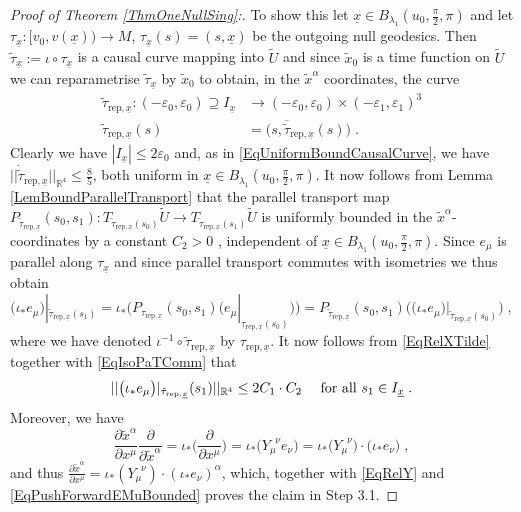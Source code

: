 \documentclass[reqno]{article}
\newcommand{\R}{\mathbb{R}}
\newcommand{\ux}{\underline{x}}
\newcommand{\rd}{\partial}
\begin{document}
\begin{proof}[Proof of Theorem \ref{ThmOneNullSing}:]
To show this let $\ux  \in B_{\lambda_1}(u_0, \frac{\pi}{2}, \pi)$ and let $\tau_{\ux} : [v_0, v(\ux)) \to M$, $\tau_{\ux} (s) = (s, \ux)$ be the outgoing null geodesics. Then $\tilde{\tau}_{\ux} := \iota \circ \tau_{\ux}$ is a causal curve mapping into $\tilde{U}$ and since $\tilde{x}_0$ is a time function on $\tilde{U}$ we can reparametrise $\tilde{\tau}_{\ux}$ by $\tilde{x}_0$ to obtain, in the $\tilde{x}^\alpha$ coordinates, the curve
\begin{equation*}
\begin{split}
\tilde{\tau}_{\mathrm{rep}, \ux} : (-\varepsilon_0, \varepsilon_0) \supseteq I_{\ux} &\to (-\varepsilon_0, \varepsilon_0) \times (-\varepsilon_1, \varepsilon_1)^3 \\
\tilde{\tau}_{\mathrm{rep}, \ux}(s) &= \big(s, \overline{\tilde{\tau}}_{\mathrm{rep}, \ux}(s)\big) \;.
\end{split}
\end{equation*}
Clearly we have $|I_{\ux}| \leq 2 \varepsilon_0$ and, as in \eqref{EqUniformBoundCausalCurve}, we have $||\dot{\tilde{\tau}}_{\mathrm{rep}, \ux} ||_{\R^4} \leq \frac{8}{5}$, both uniform in $\ux \in B_{\lambda_1}(u_0, \frac{\pi}{2}, \pi)$.
It now follows from Lemma \ref{LemBoundParallelTransport} that the parallel transport map $P_{\tilde{\tau}_{\mathrm{rep}, \ux}} (s_0, s_1) : T_{\tilde{\tau}_{\mathrm{rep}, \ux}(s_0)} \tilde{U} \to T_{\tilde{\tau}_{\mathrm{rep}, \ux}(s_1)} \tilde{U}$ is uniformly bounded in the $\tilde{x}^\alpha$-coordinates by a constant $C_2 >0$ , independent of $\ux \in B_{\lambda_1}(u_0, \frac{\pi}{2}, \pi)$. Since $e_\mu$ is parallel along $\tau_{\ux}$ and since parallel transport commutes with isometries we thus obtain 
\begin{equation}
\label{EqIsoPaTComm}
\big(\iota_* e_\mu)|_{\tilde{\tau}_{\mathrm{rep}, \ux} (s_1)} = \iota_* \Big( P_{\tau_{\mathrm{rep}, \ux}} (s_0, s_1) \big(e_\mu|_{\tau_{\mathrm{rep}, \ux}(s_0)}\big)\Big) = P_{\tilde{\tau}_{\mathrm{rep}, \ux}} (s_0, s_1) \Big( \big(\iota_* e_\mu\big)|_{\tilde{\tau}_{\mathrm{rep}, \ux}(s_0)}\Big) \;,
\end{equation}
where we have denoted $\iota^{-1} \circ \tilde{\tau}_{\mathrm{rep}, \ux}$ by $\tau_{\mathrm{rep}, \ux}$. It now follows from \eqref{EqRelXTilde} together with \eqref{EqIsoPaTComm} that
\begin{equation}
\label{EqPushForwardEMuBounded}
||\big( \iota_* e_\mu\big)|_{\tilde{\tau}_{\mathrm{rep}, \ux}} (s_1) ||_{\R^4} \leq 2 C_1 \cdot C_2  \quad \textnormal{ for all } s_1 \in I_{\ux}\;.
\end{equation} 
Moreover, we have $$\frac{\rd \tilde{x}^\alpha}{\rd x^\mu} \frac{\rd}{\rd \tilde{x}^\alpha} = \iota_* \Big( \frac{\rd}{\rd x^\mu}\Big) = \iota_* \Big( Y_{\mu}^{\; \; \nu} e_\nu\Big) = \iota_* \big( Y_{\mu}^{\; \; \nu}\big)  \cdot \big(\iota_* e_{\nu}\big) \;, $$
and thus $\frac{\rd \tilde{x}^\alpha}{\rd x^\mu} = \iota_*(Y_{\mu}^{\; \; \nu}) \cdot (\iota_* e_\nu)^\alpha$, which, together with \eqref{EqRelY} and \eqref{EqPushForwardEMuBounded} proves the claim in Step 3.1.
\newline


\end{proof}
\end{document}
